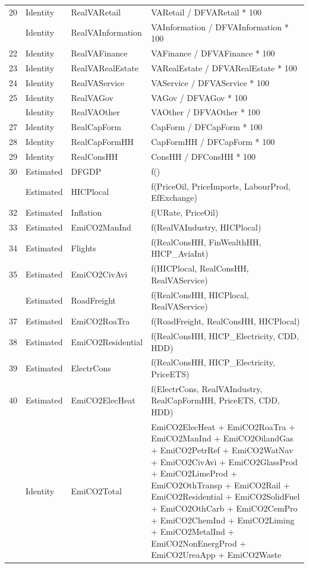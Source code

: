\begin{table}
\begin{tabular}[t]{rll>{\raggedright\arraybackslash}p{10cm}}
20 & Identity & RealVARetail & VARetail / DFVARetail * 100\\
\addlinespace
21 & Identity & RealVAInformation & VAInformation / DFVAInformation * 100\\
22 & Identity & RealVAFinance & VAFinance / DFVAFinance * 100\\
23 & Identity & RealVARealEstate & VARealEstate / DFVARealEstate * 100\\
24 & Identity & RealVAService & VAService / DFVAService * 100\\
25 & Identity & RealVAGov & VAGov / DFVAGov * 100\\
\addlinespace
26 & Identity & RealVAOther & VAOther / DFVAOther * 100\\
27 & Identity & RealCapForm & CapForm / DFCapForm * 100\\
28 & Identity & RealCapFormHH & CapFormHH / DFCapForm * 100\\
29 & Identity & RealConsHH & ConsHH / DFConsHH * 100\\
30 & Estimated & DFGDP & f()\\
\addlinespace
31 & Estimated & HICPlocal & f(PriceOil, PriceImports, LabourProd, EfExchange)\\
32 & Estimated & Inflation & f(URate, PriceOil)\\
33 & Estimated & EmiCO2ManInd & f(RealVAIndustry, HICPlocal)\\
34 & Estimated & Flights & f(RealConsHH, FinWealthHH,  HICP\_AviaInt)\\
35 & Estimated & EmiCO2CivAvi & f(HICPlocal, RealConsHH, RealVAService)\\
\addlinespace
36 & Estimated & RoadFreight & f(RealConsHH, HICPlocal, RealVAService)\\
37 & Estimated & EmiCO2RoaTra & f(RoadFreight, RealConsHH, HICPlocal)\\
38 & Estimated & EmiCO2Residential & f(RealConsHH, HICP\_Electricity, CDD, HDD)\\
39 & Estimated & ElectrCons & f(RealConsHH, HICP\_Electricity, PriceETS)\\
40 & Estimated & EmiCO2ElecHeat & f(ElectrCons, RealVAIndustry, RealCapFormHH, PriceETS, CDD, HDD)\\
\addlinespace
41 & Identity & EmiCO2Total & EmiCO2ElecHeat + EmiCO2RoaTra + EmiCO2ManInd + EmiCO2OilandGas + EmiCO2PetrRef + EmiCO2WatNav + EmiCO2CivAvi + EmiCO2GlassProd + EmiCO2LimeProd + EmiCO2OthTransp + EmiCO2Rail + EmiCO2Residential + EmiCO2SolidFuel + EmiCO2OthCarb + EmiCO2CemPro + EmiCO2ChemInd + EmiCO2Liming + EmiCO2MetalInd + EmiCO2NonEnergProd + EmiCO2UreaApp + EmiCO2Waste\\

\end{tabular}
\end{table}
